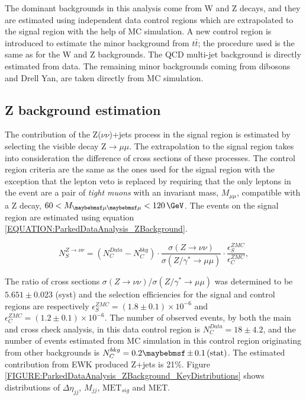 
The dominant backgrounds in this analysis come from W and Z decays, and they are estimated using independent data control regions which are extrapolated to the signal region with the help of \gls{MC} simulation. A new control region is introduced to estimate the minor background from $t\bar{t}$; the procedure used is the same as for the W and Z backgrounds. The \gls{QCD} multi-jet background is directly estimated from data. The remaining minor backgrounds coming from dibosons and Drell Yan, are taken directly from \gls{MC} simulation.

\subsection{Z background estimation}
\label{SECTION:ParkedDataAnalysis_ControlRegions_ZBackground}


The contribution of the Z($\nu\nu$)+jets process in the signal region is estimated by selecting the visible decay Z$\rightarrow\mu\mu$. The extrapolation to the signal region takes into consideration the difference of cross sections of these processes. The control region criteria are the same as the ones used for the signal region with the exception that the lepton veto is replaced by requiring that the only leptons in the event are a pair of \textit{tight muons} with an invariant mass, $M_{\mu\mu}$, compatible with a Z decay, $60<M_{\mu\mu}<120\,\GeV$. The events on the signal region are estimated using equation \ref{EQUATION:ParkedDataAnalysis_ZBackground}.

\begin{equation}
N_{S}^{Z\rightarrow\nu\nu}=\left(N_{C}^{Data}-N_{C}^{bkg}\right) \cdot\frac{\sigma\left(Z\rightarrow\nu\nu\right)}{\sigma\left(Z/\gamma^{*}\rightarrow\mu\mu\right)}\cdot \frac{\epsilon_{S}^{ZMC}}{\epsilon_{C}^{ZMC}},
\label{EQUATION:ParkedDataAnalysis_ZBackground}
\end{equation}

The ratio of cross sections $\sigma(Z\rightarrow\nu\nu)$/$\sigma(Z/\gamma^{*}\rightarrow\mu\mu)$ was determined to be $5.651\pm 0.023$ (syst) and the selection efficiencies for the signal and control regions are respectively $\epsilon_{S}^{ZMC}=(1.8\pm 0.1) \times 10^{-6}$ and $\epsilon_{C}^{ZMC}=(1.2\pm 0.1) \times 10^{-6}$. The number of observed events, by both the main and cross check analysis, in this data control region is $N_{C}^{Data}=18\pm 4.2$, and the number of events estimated from \gls{MC} simulation in this control region originating from other backgrounds is $N_{C}^{bkg}=0.2 \pm 0.1 \stat$. The estimated contribution from \gls{EWK} produced Z+jets is 21\%. Figure \ref{FIGURE:ParkedDataAnalysis_ZBackground_KeyDistributions} shows distributions of $\Delta\eta_{jj}$, $M_{jj}$, $\text{MET}_{sig}$ and \gls{MET}.


